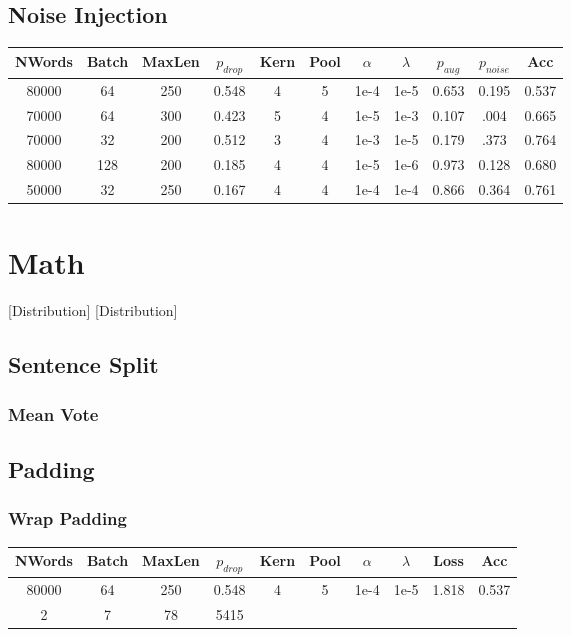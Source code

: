 \subsection{Noise Injection}
\begin{center}
 \begin{tabular}{||c c c c c c c c c c c||}
 \hline
 NWords & Batch & MaxLen & $p_{drop}$ & Kern & Pool & $\alpha$ & $\lambda$ & $p_{aug}$ & $p_{noise}$ & Acc\\ [0.5ex]
 \hline\hline
 80000 & 64 & 250 & 0.548 & 4 & 5 & 1e-4 & 1e-5 & 0.653 & 0.195 & 0.537\\
 \hline
 70000 & 64 & 300 & 0.423 & 5 & 4 & 1e-5 & 1e-3 & 0.107 & .004 & 0.665\\
 \hline
 70000 & 32 & 200 & 0.512 & 3 & 4 & 1e-3 & 1e-5 & 0.179 & .373 &  0.764\\
 \hline
 80000 & 128 & 200 & 0.185 & 4 & 4 & 1e-5 & 1e-6 & 0.973 & 0.128 &  0.680\\
 \hline
 50000 & 32 & 250 & 0.167 & 4 & 4 & 1e-4 & 1e-4 & 0.866 & 0.364 & 0.761\\
 [1ex]\hline\end{tabular}\end{center}




%
%
\section{Math}
[Distribution]
[Distribution]
\subsection{Sentence Split}
\subsubsection{Mean Vote}

\subsection{Padding}
\subsubsection{Wrap Padding}
\begin{center}\begin{tabular}{||c c c c c c c c c c ||}
 \hline
 NWords & Batch & MaxLen & $p_{drop}$ & Kern & Pool & $\alpha$ & $\lambda$ &  Loss & Acc\\ [0.5ex]
 \hline\hline
 80000 & 64 & 250 & 0.548 & 4 & 5 & 1e-4 & 1e-5 & 1.818 & 0.537\\
 \hline
 2 & 7 & 78 & 5415 \\
 [1ex]\hline\end{tabular}\end{center}


